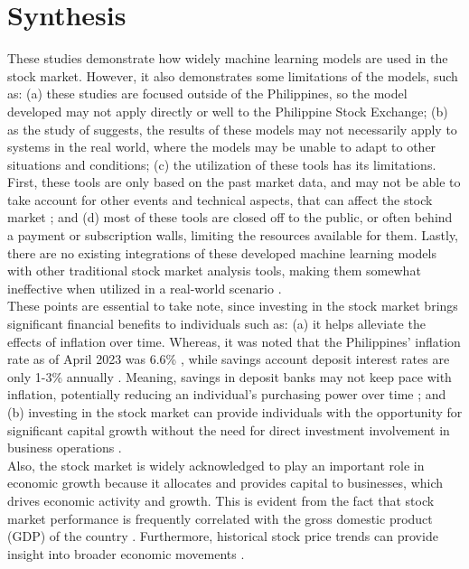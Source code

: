 \section{Synthesis}
\label{sec:2_synthesis}
These studies demonstrate how widely machine learning models are used in the stock market. 
However, it also demonstrates some limitations of the models, such as: (a) these studies 
are focused outside of the Philippines, so the model developed may not apply directly or 
well to the Philippine Stock Exchange; (b) as the study of  suggests, the results 
of these models may not necessarily apply to systems in the real world, where the models 
may be unable to adapt to other situations and conditions; 
(c) the utilization of these tools has its limitations. First, these tools
are only based on the past market data, and may not be able to take account
for other events and technical aspects, that can affect the stock market
\cite{Concoda2020}; and (d) most of these tools are closed off to the public, or often behind a 
payment or subscription walls, limiting the resources available for them.
Lastly, there are no existing integrations of these developed machine learning
models with other traditional stock market analysis tools, making them somewhat
ineffective when utilized in a real-world scenario
\cite{CHHAJER2022100015, zou2023stock}.
\\

These points are essential to take note, since investing in the stock market brings 
significant financial benefits to individuals such as: 
(a) it helps alleviate the effects of inflation over time. Whereas, it was noted 
that the Philippines' inflation rate as of April 2023 was 6.6\% \cite{NEDA2023}, 
while savings account  deposit interest rates are only 1-3\% annually \cite{BSP19}. 
Meaning, savings in deposit banks may not keep pace with inflation, 
potentially reducing an individual's purchasing power over time \cite{RBC, EdwardJones}; 
and (b) investing in the stock market can provide individuals with the opportunity for 
significant capital growth without the need for direct investment involvement in 
business operations \cite{USSecAndExComm}.
\\

Also, the stock market is widely acknowledged to play an important role in economic 
growth because it allocates and provides capital to businesses, which drives economic 
activity and growth. This is evident from the fact that stock market performance 
is frequently correlated with the gross domestic product (GDP) of the country
\cite{TradeBrains, Hall2022, Bae2017}.
Furthermore, historical stock price trends can provide insight 
into broader economic movements
\cite{Campbell2021}.
\\

